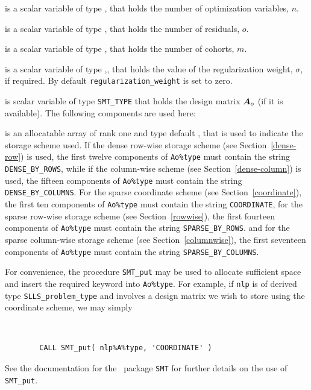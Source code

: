 \documentclass{galahad}
\newcommand{\packagename}{SLLS}
\begin{document}
\begin{description}

 is a scalar variable of type \integer,
 that holds the number of optimization variables, $n$.

 is a scalar variable of type \integer,
 that holds the number of residuals, $o$.

 is a scalar variable of type \integer,
 that holds the number of cohorts, $m$.

 is a scalar variable of type \realdp,,
 that holds the value of the regularization weight, $\sigma$, if required.
 By default {\tt regularization\_weight} is set to zero.

 is scalar variable of type {\tt SMT\_TYPE}
that holds the design matrix ${\bm{A}}_o$ (if it is available).
The following components are used here:

\begin{description}

 is an allocatable array of rank one and type default
\character, that
is used to indicate the storage scheme used. If the dense row-wise
storage scheme (see Section~\ref{dense-row}) is used,
the first twelve components of {\tt Ao\%type} must contain the
string {\tt DENSE\_BY\_ROWS}, while if the column-wise scheme
(see Section~\ref{dense-column}) is used,
the fifteen components of {\tt Ao\%type} must contain the
string {\tt DENSE\_BY\_COLUMNS}.
For the sparse coordinate scheme (see Section~\ref{coordinate}),
the first ten components of {\tt Ao\%type} must contain the
string {\tt COORDINATE},
for the sparse row-wise storage scheme (see Section~\ref{rowwise}),
the first fourteen components of {\tt Ao\%type} must contain the
string {\tt SPARSE\_BY\_ROWS}.
and for the sparse column-wise storage scheme (see Section~\ref{columnwise}),
the first seventeen components of {\tt Ao\%type} must contain the
string {\tt SPARSE\_BY\_COLUMNS}.

For convenience, the procedure {\tt SMT\_put}
may be used to allocate sufficient space and insert the required keyword
into {\tt Ao\%type}.
For example, if {\tt nlp} is of derived type {\tt \packagename\_problem\_type}
and involves a design matrix we wish to store using the coordinate scheme,
we may simply
{\tt
\begin{verbatim}
        CALL SMT_put( nlp%A%type, 'COORDINATE' )
\end{verbatim}
}
\noindent
See the documentation for the \galahad\ package {\tt SMT}
for further details on the use of {\tt SMT\_put}.


\end{description}
\end{description}
\end{document}
